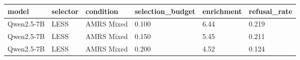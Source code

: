 \begin{tabular}{llllll}
\toprule
model & selector & condition & selection\_budget & enrichment & refusal\_rate \\
\midrule
Qwen2.5-7B & LESS & AMRS Mixed & 0.100 & 6.44 & 0.219 \\
Qwen2.5-7B & LESS & AMRS Mixed & 0.150 & 5.45 & 0.211 \\
Qwen2.5-7B & LESS & AMRS Mixed & 0.200 & 4.52 & 0.124 \\
\bottomrule
\end{tabular}
